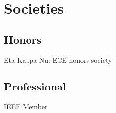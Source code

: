 \documentclass[letterpaper]{deedy-resume-openfont} %
\begin{document}
\begin{minipage}[t]{0.33\textwidth}
\section{Societies} 
\subsection{Honors}
 Eta Kappa Nu: ECE honors society \\
\subsection{Professional}
IEEE Member 

\sectionspace %

\end{minipage} %
\hfill
%
%
\end{document}
